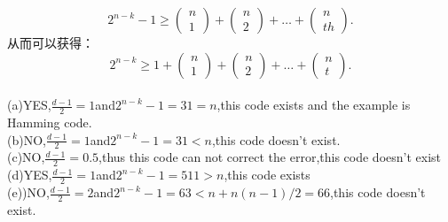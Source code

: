 \documentclass[UTF8,oneside]{article}
\begin{document}
$$
2^{n-k}-1 \geq \left(\begin{array}{l}
n \\
1
\end{array}\right)+\left(\begin{array}{l}
n \\
2
\end{array}\right)+\ldots+\left(\begin{array}{l}
n \\
th
\end{array}\right) .
$$
从而可以获得：
$$
2^{n-k} \geq 1+\left(\begin{array}{l}
n \\
1
\end{array}\right)+\left(\begin{array}{l}
n \\
2
\end{array}\right)+\ldots+\left(\begin{array}{l}
n \\
t
\end{array}\right) .
$$\\
(a)YES,\quad$\frac{d-1}{2}=1$\;and\;$2^{n-k}-1=31=n$,this code exists and the example is Hamming code.\\
(b)NO,\quad$\frac{d-1}{2}=1$\;and\;$2^{n-k}-1=31<n$,this code  doesn't exist. \\
(c)NO,\quad$\frac{d-1}{2}=0.5$,thus this code can not correct the error,this code doesn't exist\\
(d)YES,\quad$\frac{d-1}{2}=1$\;and\;$2^{n-k}-1=511>n$,this code exists\\
(e))NO,\quad$\frac{d-1}{2}=2$\;and\;$2^{n-k}-1=63<n+n(n-1)/2=66$,this code  doesn't exist. \\
\end{document}
